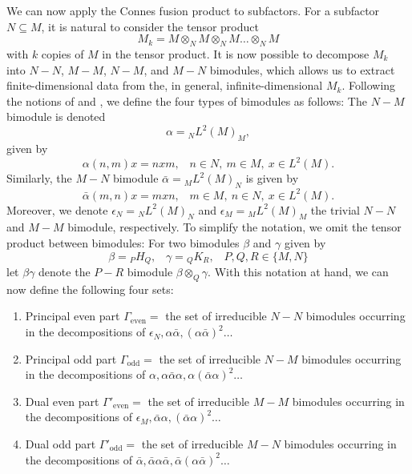 We can now apply the Connes fusion product to subfactors. For a subfactor $N\subseteq M$, it is natural to consider the tensor product 
	\begin{equation}
		M_k=M\otimes_N M\otimes_N M\dots\otimes_N M
	\end{equation}
with $k$ copies of $M$ in the tensor product. It is now possible to decompose $M_k$ into $N-N$, $M-M$, $N-M$, and $M-N$ bimodules, which allows us to extract finite-dimensional data from the, in general, infinite-dimensional $M_k$. Following the notions of \cite{Ocneanu1989} and \cite{Haagerup1994}, we define the four types of bimodules as follows: The $N-M$ bimodule is denoted
	\begin{equation}
		\alpha={}_NL^2(M)_M,
	\end{equation}
given by 
	\begin{equation}
		\alpha(n,m)x=nxm, \hspace{10pt}n\in N,\ m\in M,\ x\in L^2(M).
	\end{equation}
Similarly, the $M-N$ bimodule $\bar{\alpha}={}_ML^2(M)_N$ is given by
	\begin{equation}
		\bar{\alpha}(m,n)x=mxn, \hspace{10pt}m\in M,\ n\in N,\ x\in L^2(M).
	\end{equation}
Moreover, we denote $\epsilon_N={}_NL^2(M)_N$ and $\epsilon_M={}_ML^2(M)_M$ the trivial $N-N$ and $M-M$ bimodule, respectively. To simplify the notation, we omit the tensor product between bimodules: For two bimodules $\beta$ and $\gamma$ given by
	\begin{equation}
		\beta={}_P H_Q,\hspace{10pt} \gamma={}_Q K_R,\hspace{10pt} P,Q,R\in\{M,N\}
	\end{equation}
let $\beta\gamma$ denote the $P-R$ bimodule $\beta\otimes_Q\gamma$. With this notation at hand, we can now define the following four sets:
	\begin{enumerate}
		\item Principal even part $\Gamma_\mathrm{even}=$ the set of irreducible $N-N$ bimodules occurring in the decompositions of $\epsilon_N,\alpha\bar{\alpha},(\alpha\bar{\alpha})^2\dots$
		\item Principal odd part $\Gamma_\mathrm{odd}=$ the set of irreducible $N-M$ bimodules occurring in the decompositions of $\alpha,\alpha\bar{\alpha}\alpha,\alpha(\bar{\alpha}\alpha)^2\dots$
		\item Dual even part $\Gamma'_\mathrm{even}=$ the set of irreducible $M-M$ bimodules occurring in the decompositions of $\epsilon_M,\bar{\alpha}\alpha,(\bar{\alpha}\alpha)^2\dots$
		\item Dual odd part $\Gamma'_\mathrm{odd}=$ the set of irreducible $M-N$ bimodules occurring in the decompositions of $\bar{\alpha},\bar{\alpha}\alpha\bar{\alpha},\bar{\alpha}(\alpha\bar{\alpha})^2\dots$
	\end{enumerate}
